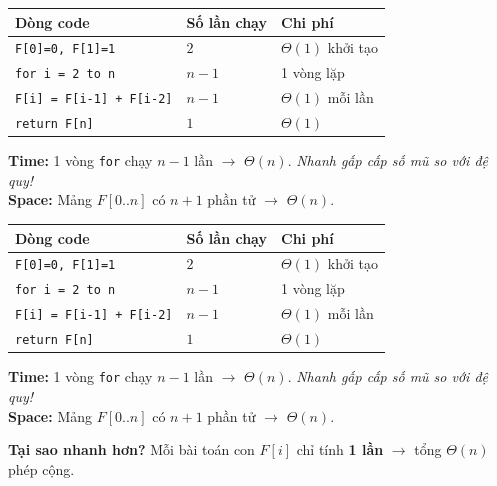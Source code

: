 \documentclass[10pt]{article}
\begin{document}
\begin{tcolorbox}[colback=yellow!5, colframe=orange!50, boxrule=0.5pt, arc=2pt, title={\small\textbf{Phân tích Complexity -- Fibonacci DP Bottom-up}}]
\begin{tabular}{|l|l|l|}
\hline
\textbf{Dòng code} & \textbf{Số lần chạy} & \textbf{Chi phí} \\
\hline
\texttt{F[0]=0, F[1]=1} & $2$ & $\Theta(1)$ khởi tạo \\
\hline
\texttt{for i = 2 to n} & $n-1$ & 1 vòng lặp \\
\hline
\quad \texttt{F[i] = F[i-1] + F[i-2]} & $n-1$ & $\Theta(1)$ mỗi lần \\
\hline
\texttt{return F[n]} & $1$ & $\Theta(1)$ \\
\hline
\end{tabular}
\vspace{0.2cm}

\textbf{Time:} 1 vòng \texttt{for} chạy $n-1$ lần $\to$ $\Theta(n)$. \textit{Nhanh gấp cấp số mũ so với đệ quy!}\\
\textbf{Space:} Mảng $F[0..n]$ có $n+1$ phần tử $\to$ $\Theta(n)$.
\end{tcolorbox}

\begin{tcolorbox}[colback=yellow!5, colframe=orange!50, boxrule=0.5pt, arc=2pt, title={\small\textbf{Phân tích Complexity -- Fibonacci DP Bottom-up}}]
\begin{tabular}{|l|l|l|}
\hline
\textbf{Dòng code} & \textbf{Số lần chạy} & \textbf{Chi phí} \\
\hline
\texttt{F[0]=0, F[1]=1} & $2$ & $\Theta(1)$ khởi tạo \\
\hline
\texttt{for i = 2 to n} & $n-1$ & 1 vòng lặp \\
\hline
\quad \texttt{F[i] = F[i-1] + F[i-2]} & $n-1$ & $\Theta(1)$ mỗi lần \\
\hline
\texttt{return F[n]} & $1$ & $\Theta(1)$ \\
\hline
\end{tabular}
\vspace{0.2cm}

\textbf{Time:} 1 vòng \texttt{for} chạy $n-1$ lần $\to$ $\Theta(n)$. \textit{Nhanh gấp cấp số mũ so với đệ quy!}\\
\textbf{Space:} Mảng $F[0..n]$ có $n+1$ phần tử $\to$ $\Theta(n)$.
\end{tcolorbox}

\textbf{Tại sao nhanh hơn?} Mỗi bài toán con \(F[i]\) chỉ tính \textbf{1
lần} \(\to\) tổng \(\Theta(n)\) phép cộng.
\end{document}
